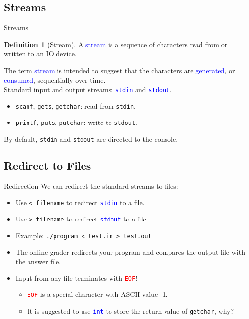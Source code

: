 \documentclass{beamer}
\newcommand{\red}[1]{\textcolor{red}{#1}}
\newcommand{\blue}[1]{\textcolor{blue}{#1}}
\newcommand{\ttt}[1]{\texttt{#1}}
\newcommand{\bluett}[1]{\blue{\ttt{#1}}}
\newcommand{\redtt}[1]{\red{\ttt{#1}}}
\theoremstyle{definition}
\newtheorem{dfn}{Definition}
\begin{document}
\subsection{Streams}

\begin{frame}{Streams}
    \begin{dfn}[Stream]
        A \blue{stream} is a sequence of characters read from or written to an IO device.
    \end{dfn}
    The term \blue{stream} is intended to suggest that the characters are \blue{generated}, or \blue{consumed}, sequentially over time.\\
    \pause
    Standard input and output streams: \bluett{stdin} and \bluett{stdout}.
    \begin{itemize}
        \item \ttt{scanf}, \ttt{gets}, \ttt{getchar}: read from \ttt{stdin}.
        \item \ttt{printf}, \ttt{puts}, \ttt{putchar}: write to \ttt{stdout}.
    \end{itemize}
    By default, \ttt{stdin} and \ttt{stdout} are directed to the console.
\end{frame}

\subsection{Redirect to Files}

\begin{frame}{Redirection}
    We can redirect the standard streams to files:
    \begin{itemize}
        \item Use \ttt{< filename} to redirect \bluett{stdin} to a file.
        \item Use \ttt{> filename} to redirect \bluett{stdout} to a file.
        \pause
        \item Example: \ttt{./program < test.in > test.out}
        \item The online grader redirects your program and compares the output file with the answer file.
        \pause
        \item Input from any file terminates with \redtt{EOF}!
        \begin{itemize}
            \item \redtt{EOF} is a special character with ASCII value -1.
            \item It is suggested to use \bluett{int} to store the return-value of \ttt{getchar}, why?
        \end{itemize}
    \end{itemize}
\end{frame}
\end{document}
